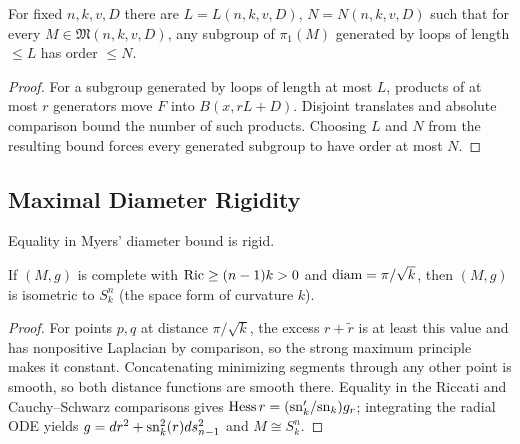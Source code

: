 \begin{lemma}
  \label{lem:pet-ch7-anderson-short-loops}

  For fixed $n,k,v,D$ there are $L=L(n,k,v,D)$, $N=N(n,k,v,D)$ such that for
  every $M\in\mathfrak{M}(n,k,v,D)$, any subgroup of $\pi_1(M)$ generated by
  loops of length $\le L$ has order $\le N$.
\end{lemma}
\begin{proof}
  \sketch
  For a subgroup generated by loops of length at most \(L\), products of at most \(r\) generators move \(F\) into \(B(x,rL+D)\). Disjoint translates and absolute comparison bound the number of such products. Choosing \(L\) and \(N\) from the resulting bound forces every generated subgroup to have order at most \(N\).
\end{proof}

\subsection{Maximal Diameter Rigidity}

Equality in Myers' diameter bound is rigid.

\begin{theorem}
  \label{thm:pet-ch7-cheng-rigidity}

  If $(M,g)$ is complete with $\operatorname{Ric}\ge(n-1)k>0$ and $\operatorname{diam}=\pi/\sqrt k$, then
  $(M,g)$ is isometric to $S^n_k$ (the space form of curvature $k$).
\end{theorem}
\begin{proof}
  \sketch
  For points \(p,q\) at distance \(\pi/\sqrt{k}\), the excess \(r+\widetilde r\) is at least this value and has nonpositive Laplacian by comparison, so the strong maximum principle makes it constant. Concatenating minimizing segments through any other point is smooth, so both distance functions are smooth there. Equality in the Riccati and Cauchy--Schwarz comparisons gives \(\operatorname{Hess} r=(\mathrm{sn}_k'/\mathrm{sn}_k)g_r\); integrating the radial ODE yields \(g=dr^2+\mathrm{sn}_k^2(r)ds_{n-1}^2\) and \(M\cong S_k^n\).
\end{proof}

